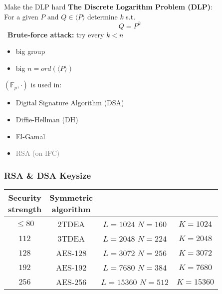 \documentclass{beamer}
\begin{document}
\begin{frame}{Make the DLP hard}
\textbf{The Discrete Logarithm Problem (DLP)}: \\
For a given $P$ and $Q \in \langle P \rangle$ determine $k$ s.t. \\
\[Q=P^k\]
\
\textbf{Brute-force attack:}
try every $k < n$
\begin{itemize}
	\item big group
	\item big $n=ord(\langle P \rangle)$ 
\end{itemize}

\pause
\vspace{1cm}
$(\mathbb{F}_p, \cdot)$ \pause is used in:
\begin{itemize}
\item Digital Signature Algorithm (DSA)
\item Diffie-Hellman (DH)
\item El-Gamal
\item \textcolor{gray}{RSA (on IFC)}
\end{itemize}
\end{frame}
\begin{frame}
	\frametitle{RSA \& DSA Keysize}
	\begin{center}
		\begin{tabular}{|c|c|c|c|}
			\hline
			\thead{Security \\strength}& \thead{Symmetric \\algorithm} & \thead{FFC(DSA)}& \thead{IFC(RSA)} \\ \hline
			\cellcolor{red!25}$\leq 80$ & 2TDEA & \makecell{$L=1024$\\$N=160$} & \cellcolor{green!25}$K=1024$ \\ \hline  
			\cellcolor{orange!25}$112$ & 3TDEA & \makecell{$L=2048$\\$N=224$} & \cellcolor{green!25}$K=2048$ \\ \hline  
			\cellcolor{orange!25}$128$ & AES-128 & \makecell{$L=3072$\\$N=256$} & \cellcolor{green!25}$K=3072$ \\ \hline  
			\cellcolor{green!25}$192$ & AES-192 & \makecell{$L=7680$\\$N=384$} & \cellcolor{red!25}$K=7680$ \\ \hline  
			\cellcolor{green!25}$256$ & AES-256 & \makecell{$L=15360$\\$N=512$} & \cellcolor{red!25}$K=15360$ \\ \hline  
		\end{tabular}
	\end{center}
	
\end{frame}
\end{document}
